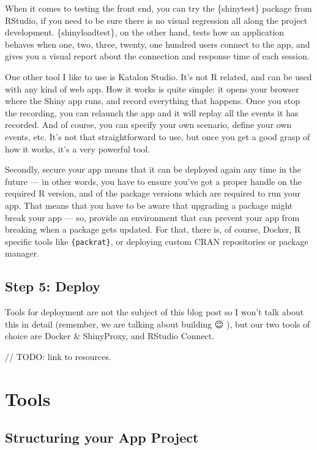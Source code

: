 \documentclass[]{book}
\begin{document}
When it comes to testing the front end, you can try the \{shinytest\} package from RStudio, if you need to be sure there is no visual regression all along the project development. \{shinyloadtest\}, on the other hand, tests how an application behaves when one, two, three, twenty, one hundred users connect to the app, and gives you a visual report about the connection and response time of each session.

One other tool I like to use is Katalon Studio. It's not R related, and can be used with any kind of web app. How it works is quite simple: it opens your browser where the Shiny app runs, and record everything that happens. Once you stop the recording, you can relaunch the app and it will replay all the events it has recorded. And of course, you can specify your own scenario, define your own events, etc. It's not that straightforward to use, but once you get a good grasp of how it works, it's a very powerful tool.

Secondly, secure your app means that it can be deployed again any time in the future --- in other words, you have to ensure you've got a proper handle on the required R version, and of the package versions which are required to run your app. That means that you have to be aware that upgrading a package might break your app --- so, provide an environment that can prevent your app from breaking when a package gets updated. For that, there is, of course, Docker, R specific tools like \texttt{\{packrat\}}, or deploying custom CRAN repositories or package manager.

\hypertarget{step-deploy}{%
\chapter{Step 5: Deploy}\label{step-deploy}}

Tools for deployment are not the subject of this blog post so I won't talk about this in detail (remember, we are talking about building 😉 ), but our two tools of choice are Docker \& ShinyProxy, and RStudio Connect.

// TODO: link to resources.

\hypertarget{part-tools}{%
\part{Tools}\label{part-tools}}

\hypertarget{structure}{%
\chapter{Structuring your App Project}\label{structure}}
\end{document}
